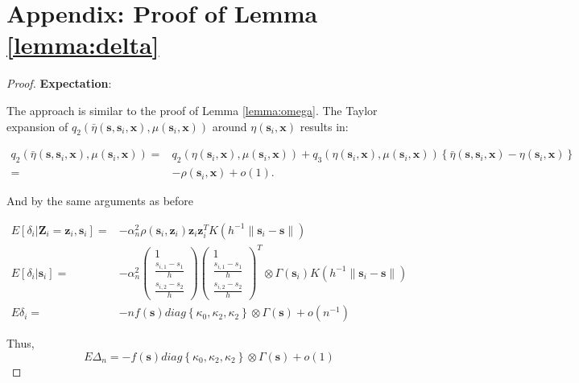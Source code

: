 \documentclass[12pt,english,authoryear, review]{article}\usepackage[]{graphicx}\usepackage[]{color}
\theoremstyle{plain}
\theoremstyle{plain}
\begin{document}
\section*{Appendix: Proof of Lemma \ref{lemma:delta}}
\begin{proof}
\textbf{Expectation}:

The approach is similar to the proof of Lemma \ref{lemma:omega}.
The Taylor expansion of $q_{2}\left(\bar{\eta}\left(\bm{s},\bm{s}_{i},\bm{x}\right),\mu\left(\bm{s}_{i},\bm{x}\right)\right)$
around $\eta\left(\bm{s}_{i},\bm{x}\right)$ results in:

\begin{align*}
q_{2}\left(\bar{\eta}\left(\bm{s},\bm{s}_{i},\bm{x}\right),\mu\left(\bm{s}_{i},\bm{x}\right)\right)= & q_{2}\left(\eta\left(\bm{s}_{i},\bm{x}\right),\mu\left(\bm{s}_{i},\bm{x}\right)\right)+q_{3}\left(\eta\left(\bm{s}_{i},\bm{x}\right),\mu\left(\bm{s}_{i},\bm{x}\right)\right)\left\{ \bar{\eta}\left(\bm{s},\bm{s}_{i},\bm{x}\right)-\eta\left(\bm{s}_{i},\bm{x}\right)\right\} \\
= & -\rho\left(\bm{s}_{i},\bm{x}\right)+o\left(1\right).
\end{align*}


And by the same arguments as before

\begin{align*}
E\left[\delta_{i}|\bm{Z}_{i}=\bm{z}_{i},\bm{s}_{i}\right]= & -\alpha_{n}^{2}\rho\left(\bm{s}_{i},\bm{z}_{i}\right)\bm{z}_{i}\bm{z}_{i}^{T}K\left(h^{-1}\|\bm{s}_{i}-\bm{s}\|\right)\\
E\left[\delta_{i}|\bm{s}_{i}\right]= & -\alpha_{n}^{2}\left(\begin{array}{c}
1\\
\frac{s_{i,1}-s_{1}}{h}\\
\frac{s_{i,2}-s_{2}}{h}
\end{array}\right)\left(\begin{array}{c}
1\\
\frac{s_{i,1}-s_{1}}{h}\\
\frac{s_{i,2}-s_{2}}{h}
\end{array}\right)^{T}\otimes\Gamma\left(\bm{s}_{i}\right)K\left(h^{-1}\|\bm{s}_{i}-\bm{s}\|\right)\\
E\delta_{i}= & -nf\left(\bm{s}\right)diag\left\{ \kappa_{0},\kappa_{2},\kappa_{2}\right\} \otimes\Gamma\left(\bm{s}\right)+o\left(n^{-1}\right)
\end{align*}


Thus, 
\[
E\Delta_{n}=-f\left(\bm{s}\right)diag\left\{ \kappa_{0},\kappa_{2},\kappa_{2}\right\} \otimes\Gamma\left(\bm{s}\right)+o\left(1\right)
\]



\end{proof}
\end{document}

